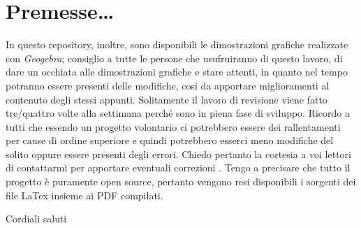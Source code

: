 \section{Premesse\dots}

In questo repository, inoltre,  sono disponibili le dimostrazioni grafiche realizzate
con \textit{Geogebra}; consiglio a tutte le persone che usufruiranno di questo lavoro, di dare un occhiata alle dimostrazioni grafiche e stare attenti,  in quanto nel tempo potranno  essere presenti delle modifiche, cosi da apportare miglioramenti al contenuto degli stessi appunti.  Solitamente il lavoro di revisione viene fatto tre/quattro volte alla settimana perché sono in piena fase di sviluppo.  Ricordo a tutti che essendo un progetto volontario ci potrebbero essere dei rallentamenti per cause di ordine superiore e quindi
potrebbero esserci meno modifiche del solito oppure essere presenti degli errori.  Chiedo pertanto  la cortesia a voi lettori di contattarmi per apportare eventuali correzioni .  Tengo a precisare che tutto il progetto è puramente open source, pertanto vengono resi disponibili i sorgenti dei file LaTex  insieme ai PDF compilati.

\begin{center}
	Cordiali saluti
\end{center}
\newpage
